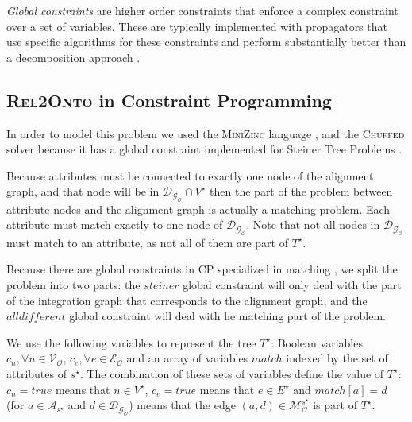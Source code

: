 \documentclass[letterpaper]{article} %
\newcommand{\minizinc}{\textsc{MiniZinc}}
\newcommand{\chuffed}{\textsc{Chuffed}}
\newcommand{\relonto}{\textsc{Rel2Onto}}
\newcommand{\ignore}[1]{}
\begin{document}
\emph{Global constraints} are higher order constraints that enforce a 
complex 
constraint over a set of variables. These are typically implemented with 
propagators that use specific algorithms for these 
constraints and perform substantially better than a decomposition approach
\cite{regin1994filtering,beldiceanu2012global}.

\ignore{
\subsubsection{Example} Consider the toy problem $P$ over variables $a$ and $b$ 
such that $a \in \{2,3,4\}$, $b \in \{1,2,3\}$. Let $C = \{a + 2b \leq 4, a 
\neq b\}$ be the constraints. If the search step decides that $a = 
2$, then $(i)$ $a \neq b \Rightarrow b \in \{1,3\}$ and $(ii)$ $a + 2b \leq 4  
\Rightarrow b \in \{1\}$. Thus we automatically know that $b = 1$ without never 
trying any other of its original possible values. $\square$
}

\subsection{\relonto{} in Constraint Programming}
In order to model this problem we used the \minizinc{} language 
\cite{minizinc}, and the 
\chuffed{} solver \cite{chu2011improving} because it has a global constraint 
implemented for Steiner 
Tree Problems \cite{deuna2016steiner}. 

Because attributes must be connected to exactly one node of the alignment 
graph, and that node will be in $\mathcal{D_{G_O}} \cap V^\star$ 
then the part of the problem between attribute nodes and the alignment graph is 
actually a matching problem. Each attribute must match exactly to one node of 
$\mathcal{D_{G_O}}$. Note that not all nodes in $\mathcal{D_{G_O}}$ must match 
to an attribute, as not all of them are part of $T^\star$.

Because there are global constraints in CP specialized in matching 
\cite{regin1994filtering}, we split the problem into two parts: the 
$\mathit{steiner}$ global constraint will only deal with the part of the 
integration graph that corresponds to the alignment graph, and the 
$\mathit{alldifferent}$ global constraint will deal with he matching part of 
the 
problem.

We use the following variables to represent the tree $T^\star$: Boolean 
variables $c_n,\forall n \in 
\mathcal{V_O}$, $c_e, \forall e \in	\mathcal{E_O}$ and an array of variables 
$match$ indexed by the set of attributes of $s^\star$. The combination of these 
sets of variables define the value of $T^\star$: $c_n = \mathit{true}$ means 
that $n \in V^\star$, $c_e = \mathit{true}$ means that $e \in E^\star$ and 
$match[a] = d$ (for $a \in \mathcal{A}_{s^\star}$ and $d \in 
\mathcal{D_{G_O}}$) means that the edge $(a,d) \in 
\mathcal{M}_\mathcal{O}^{s^\star}$ is part of $T^\star$.
\end{document}
